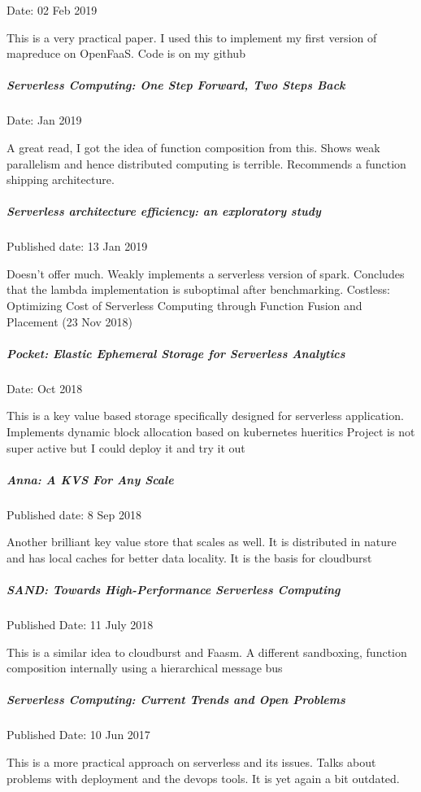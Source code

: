 \documentclass[12pt,titlepage]{article}
\begin{document}
Date: 02 Feb 2019

This is a very practical paper. I used this to implement my first version of mapreduce on OpenFaaS. Code is on my github

\subparagraph{Serverless Computing: One Step Forward, Two Steps Back}
\label{sec:org58ad0be}

Date: Jan 2019

A great read, I got the idea of function composition from this.
Shows weak parallelism and hence distributed computing is terrible.
Recommends a function shipping architecture.

\subparagraph{Serverless architecture efficiency: an exploratory study}
\label{sec:org5e5e165}

Published date: 13 Jan 2019

Doesn’t offer much. Weakly implements a serverless version of spark.
Concludes that the lambda implementation is suboptimal after benchmarking.
Costless: Optimizing Cost of Serverless Computing through Function Fusion and Placement (23 Nov 2018)

\subparagraph{Pocket: Elastic Ephemeral Storage for Serverless Analytics}
\label{sec:org350fc13}

Date: Oct 2018

This is a key value based storage specifically designed for serverless application. 
Implements dynamic block allocation based on kubernetes hueritics 
Project is not super active but I could deploy it and try it out

\subparagraph{Anna: A KVS For Any Scale}
\label{sec:org1803232}

Published date: 8 Sep 2018

Another brilliant key value store that scales as well. It is distributed in nature and has local caches for better data locality. It is the basis for cloudburst

\subparagraph{SAND: Towards High-Performance Serverless Computing}
\label{sec:org627e534}

Published Date: 11 July 2018

This is a similar idea to cloudburst and Faasm. A different sandboxing, function composition internally using a hierarchical message bus

\subparagraph{Serverless Computing: Current Trends and Open Problems}
\label{sec:org56ddc63}

Published Date: 10 Jun 2017

This is a more practical approach on serverless and its issues.
Talks about problems with deployment and the devops tools. 
It is yet again a bit outdated. 
\end{document}
